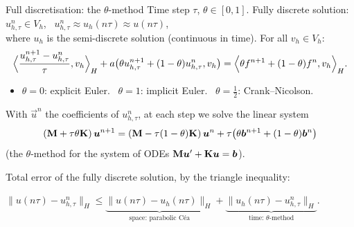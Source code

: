 \begin{frame}{Full discretisation: the $\theta$-method}
  \small
  Time step $\tau$, $\theta \in [0,1]$. \alert{Fully discrete solution}: $u_{h,\tau}^n \in V_h$, \ $u_{h,\tau}^n \approx u_h(n\tau) \approx u(n\tau)$,\\
  where $u_h$ is the semi-discrete solution (continuous in time).
  For all $v_h \in V_h$:
  \[
    \Big\langle \frac{u_{h,\tau}^{n+1} - u_{h,\tau}^n}{\tau}, v_h \Big\rangle_H + a\big(\theta u_{h,\tau}^{n+1} + (1-\theta) u_{h,\tau}^n, v_h\big)
    = \Big\langle \theta f^{n+1} + (1-\theta) f^n, v_h \Big\rangle_H.
  \]
  \begin{itemize}
    \item $\theta = 0$: explicit Euler. \ $\theta = 1$: implicit Euler. \ $\theta = \frac12$: Crank--Nicolson.
  \end{itemize}
  With $\vec u^n$ the coefficients of $u_{h,\tau}^n$, at each step we solve the linear system
  \[
    (\mathbf{M} + \tau \theta \mathbf{K})\, \bm{u}^{n+1} = (\mathbf{M} - \tau(1-\theta)\mathbf{K})\, \bm{u}^n + \tau\big(\theta \bm{b}^{n+1} + (1-\theta) \bm{b}^n\big)
  \]
  (the $\theta$-method for the system of ODEs $\mathbf{M} \bm{u}' + \mathbf{K} \bm{u} = \bm{b}$).
  \begin{remark}
    Total error of the fully discrete solution, by the triangle inequality:\par
    \centering
    $\displaystyle \|u(n\tau) - u_{h,\tau}^n\|_H \le \underbrace{\|u(n\tau) - u_h(n\tau)\|_H}_{\text{space: parabolic Céa}} + \underbrace{\|u_h(n\tau) - u_{h,\tau}^n\|_H}_{\text{time: $\theta$-method}}.$
  \end{remark}
\end{frame}

